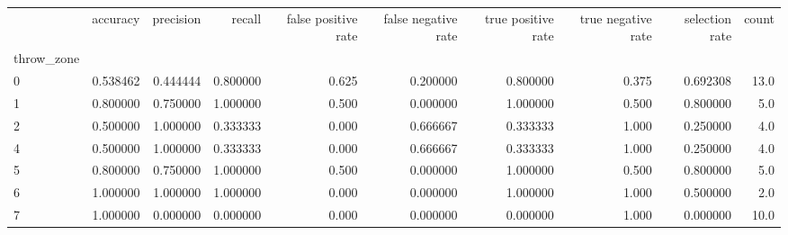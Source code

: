 \begin{tabular}{lrrrrrrrrr}
\toprule
{} &  accuracy &  precision &    recall &  false positive rate &  false negative rate &  true positive rate &  true negative rate &  selection rate &  count \\
throw\_zone &           &            &           &                      &                      &                     &                     &                 &        \\
\midrule
0          &  0.538462 &   0.444444 &  0.800000 &                0.625 &             0.200000 &            0.800000 &               0.375 &        0.692308 &   13.0 \\
1          &  0.800000 &   0.750000 &  1.000000 &                0.500 &             0.000000 &            1.000000 &               0.500 &        0.800000 &    5.0 \\
2          &  0.500000 &   1.000000 &  0.333333 &                0.000 &             0.666667 &            0.333333 &               1.000 &        0.250000 &    4.0 \\
4          &  0.500000 &   1.000000 &  0.333333 &                0.000 &             0.666667 &            0.333333 &               1.000 &        0.250000 &    4.0 \\
5          &  0.800000 &   0.750000 &  1.000000 &                0.500 &             0.000000 &            1.000000 &               0.500 &        0.800000 &    5.0 \\
6          &  1.000000 &   1.000000 &  1.000000 &                0.000 &             0.000000 &            1.000000 &               1.000 &        0.500000 &    2.0 \\
7          &  1.000000 &   0.000000 &  0.000000 &                0.000 &             0.000000 &            0.000000 &               1.000 &        0.000000 &   10.0 \\
\bottomrule
\end{tabular}
